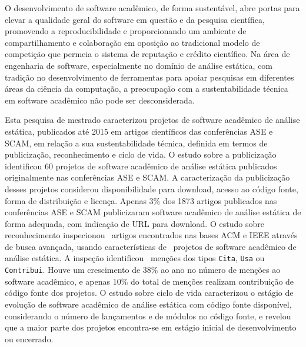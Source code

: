 \label{conclusoes}


O desenvolvimento de software acadêmico, de forma sustentável,
abre portas para elevar a qualidade geral do software em questão e
da pesquisa científica, promovendo a reproducibilidade e
proporcionando um ambiente de compartilhamento e colaboração 
em oposição ao tradicional modelo de competição que permeia
o sistema de reputação e crédito científico.
%
Na área de engenharia de software, 
especialmente no domínio de análise estática,
com tradição no desenvolvimento de ferramentas para apoiar pesquisas
em diferentes áreas da ciência da computação,
a preocupação com a sustentabilidade técnica em software acadêmico
não pode ser desconsiderada. 

Esta pesquisa de mestrado caracterizou
projetos de software acadêmico de análise estática,
publicados até 2015 em artigos científicos das conferências ASE e SCAM,
em relação a sua sustentabilidade técnica, definida
em termos de publicização, reconhecimento e ciclo de vida.
%
O estudo sobre a publicização
identificou 60 projetos de software acadêmico de análise estática
publicados originalmente nas conferências ASE e SCAM.
A caracterização da publicização desses projetos considerou
disponibilidade para download, acesso ao código fonte, forma de distribuição e licença.
Apenas 3\% dos 1873 artigos publicados nas conferências ASE e SCAM 
publicizaram software acadêmico de análise estática de forma adequada,
com indicação de URL para download.
%
O estudo sobre reconhecimento 
inspecionou \SearchUniqueCount \ artigos encontrados nas bases ACM
e IEEE através de busca avançada, 
usando características de \SoftwareCount \ projetos 
de software acadêmico de análise estática. 
A inspeção identificou  \ScreeningCount \ menções 
dos tipos \texttt{Cita}, \texttt{Usa} ou \texttt{Contribui}.
Houve um crescimento de 38\% ao ano no número de menções ao software acadêmico, 
e apenas 10\% do total de menções realizam contribuição de código fonte dos
projetos.
%
O estudo sobre ciclo de vida
caracterizou o estágio de evolução de software acadêmico de análise estática
com código fonte disponível,
considerando o número de lançamentos e de módulos no código fonte,
e revelou que a maior parte dos projetos encontra-se 
em estágio inicial de desenvolvimento ou encerrado.

